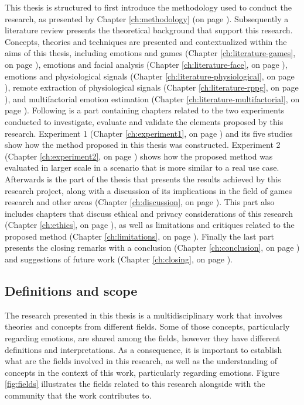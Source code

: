 This thesis is structured to first introduce the methodology used to conduct the research, as presented by Chapter \ref{ch:methodology} (on page \pageref{ch:methodology}). Subsequently a literature review presents the theoretical background that support this research. Concepts, theories and techniques are presented and contextualized within the aims of this thesis, including emotions and games (Chapter \ref{ch:literature-games}, on page \pageref{ch:literature-games}), emotions and facial analysis (Chapter \ref{ch:literature-face}, on page \pageref{ch:literature-face}), emotions and physiological signals (Chapter \ref{ch:literature-physiological}, on page \pageref{ch:literature-physiological}), remote extraction of physiological signals (Chapter \ref{ch:literature-rppg}, on page \pageref{ch:literature-rppg}), and multifactorial emotion estimation (Chapter \ref{ch:literature-multifactorial}, on page \pageref{ch:literature-multifactorial}). Following is a part containing chapters related to the two experiments conducted to investigate, evaluate and validate the elements proposed by this research. Experiment 1 (Chapter \ref{ch:experiment1}, on page \pageref{ch:experiment1}) and its five studies show how the method proposed in this thesis was constructed. Experiment 2 (Chapter \ref{ch:experiment2}, on page \pageref{ch:experiment2}) shows how the proposed method was evaluated in larger scale in a scenario that is more similar to a real use case. Afterwards is the part of the thesis that presents the results achieved by this research project, along with a discussion of its implications in the field of games research and other areas (Chapter \ref{ch:discussion}, on page \pageref{ch:discussion}). This part also includes chapters that discuss ethical and privacy considerations of this research (Chapter \ref{ch:ethics}, on page \pageref{ch:ethics}), as well as limitations and critiques related to the proposed method (Chapter \ref{ch:limitations}, on page \pageref{ch:limitations}). Finally the last part presents the closing remarks with a conclusion (Chapter \ref{ch:conclusion}, on page \pageref{ch:conclusion}) and suggestions of future work (Chapter \ref{ch:closing}, on page \pageref{ch:closing}).

\subsection{Definitions and scope}

The research presented in this thesis is a multidisciplinary work that involves theories and concepts from different fields. Some of those concepts, particularly regarding emotions, are shared among the fields, however they have different definitions and interpretations. As a consequence, it is important to establish what are the fields involved in this research, as well as the understanding of concepts in the context of this work, particularly regarding emotions. Figure \ref{fig:fields} illustrates the fields related to this research alongside with the community that the work contributes to.

